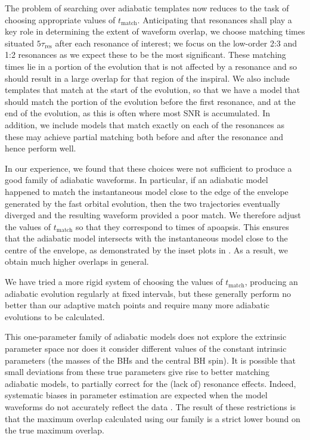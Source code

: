 The problem of searching over adiabatic templates now reduces to the task of choosing appropriate values of $t_{\mathrm{match}}$. Anticipating that resonances shall play a key role in determining the extent of waveform overlap, we choose matching times situated $5\tau_\mathrm{res}$ after each resonance of interest; we focus on the low-order 2:3 and 1:2 resonances as we expect these to be the most significant. These matching times lie in a portion of the evolution that is not affected by a resonance and so should result in a large overlap for that region of the inspiral. We also include templates that match at the start of the evolution, so that we have a model that should match the portion of the evolution before the first resonance, and at the end of the evolution, as this is often where most SNR is accumulated. In addition, we include models that match exactly on each of the resonances as these may achieve partial matching both before and after the resonance and hence perform well.

In our experience, we found that these choices were not sufficient to produce a good family of adiabatic waveforms. In particular, if an adiabatic model happened to match the instantaneous model close to the edge of the envelope generated by the fast orbital evolution, then the two trajectories eventually diverged and the resulting waveform provided a poor match. We therefore adjust the values of $t_{\mathrm{match}}$ so that they correspond to times of apoapsis. This ensures that the adiabatic model intersects with the instantaneous model close to the centre of the envelope, as demonstrated by the inset plots in . As a result, we obtain much higher overlaps in general.

We have tried a more rigid system of choosing the values of $t_{\mathrm{match}}$, producing an adiabatic evolution regularly at fixed intervals, but these generally perform no better than our adaptive match points and require many more adiabatic evolutions to be calculated.

This one-parameter family of adiabatic models does not explore the extrinsic parameter space nor does it consider different values of the constant intrinsic parameters (the masses of the BHs and the central BH spin). It is possible that small deviations from these true parameters give rise to better matching adiabatic models, to partially correct for the (lack of) resonance effects. Indeed, systematic biases in parameter estimation are expected when the model waveforms do not accurately reflect the data \citep{cutler_lisa_2007}. The result of these restrictions is that the maximum overlap calculated using our family is a strict lower bound on the true maximum overlap.

